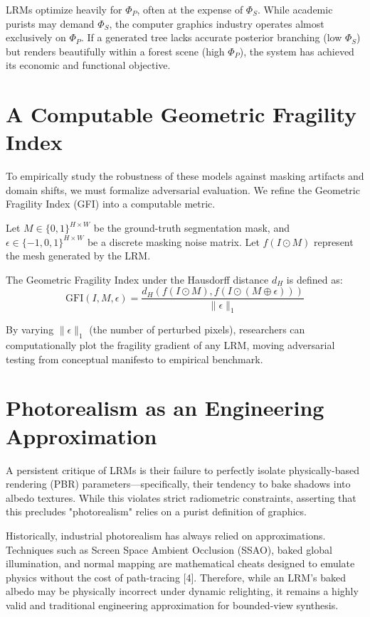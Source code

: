 \documentclass[10pt,journal,compsoc]{IEEEtran}
\begin{document}
LRMs optimize heavily for $\Phi_P$, often at the expense of $\Phi_S$. While academic purists may demand $\Phi_S$, the computer graphics industry operates almost exclusively on $\Phi_P$. If a generated tree lacks accurate posterior branching (low $\Phi_S$) but renders beautifully within a forest scene (high $\Phi_P$), the system has achieved its economic and functional objective.

\section{A Computable Geometric Fragility Index}
To empirically study the robustness of these models against masking artifacts and domain shifts, we must formalize adversarial evaluation. We refine the Geometric Fragility Index (GFI) into a computable metric.

Let $M \in \{0,1\}^{H \times W}$ be the ground-truth segmentation mask, and $\epsilon \in \{-1,0,1\}^{H \times W}$ be a discrete masking noise matrix. Let $f(I \odot M)$ represent the mesh generated by the LRM. 

\begin{definition}
The Geometric Fragility Index under the Hausdorff distance $d_H$ is defined as:
\[ \text{GFI}(I, M, \epsilon) = \frac{d_H( f(I \odot M), f(I \odot (M \oplus \epsilon)) )}{\|\epsilon\|_1} \]
\end{definition}
By varying $\|\epsilon\|_1$ (the number of perturbed pixels), researchers can computationally plot the fragility gradient of any LRM, moving adversarial testing from conceptual manifesto to empirical benchmark.

\section{Photorealism as an Engineering Approximation}
A persistent critique of LRMs is their failure to perfectly isolate physically-based rendering (PBR) parameters—specifically, their tendency to bake shadows into albedo textures. While this violates strict radiometric constraints, asserting that this precludes "photorealism" relies on a purist definition of graphics.

Historically, industrial photorealism has always relied on approximations. Techniques such as Screen Space Ambient Occlusion (SSAO), baked global illumination, and normal mapping are mathematical cheats designed to emulate physics without the cost of path-tracing [4]. Therefore, while an LRM's baked albedo may be physically incorrect under dynamic relighting, it remains a highly valid and traditional engineering approximation for bounded-view synthesis.
\end{document}
